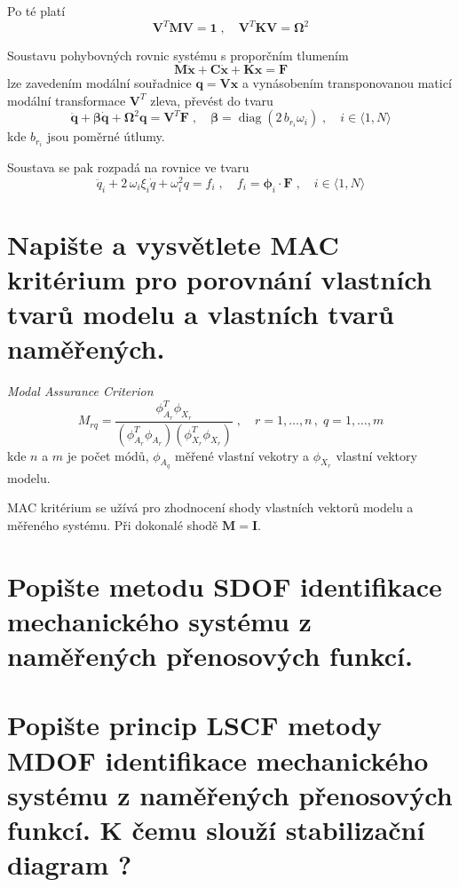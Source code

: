 \documentclass{article}
\begin{document}
	Po té platí
	\begin{equation*}
		\bm{V}^T\bm{M}\bm{V} = \bm{1}
		\;,\quad 
		\bm{V}^T\bm{K}\bm{V} = \bm{\Omega}^2
	\end{equation*}

	Soustavu pohybovných rovnic systému s proporčním tlumením
	\begin{equation*}
		\bm{M}\bm{\ddot{x}} + \bm{C}\bm{\dot{x}} + \bm{K}\bm{x} = \bm{F}
	\end{equation*}
	lze zavedením modální souřadnice $\bm{q} = \bm{V}\bm{x}$ a vynásobením transponovanou maticí modální transformace $\bm{V}^T$ zleva, převést do tvaru
	\begin{equation*}
		\bm{\ddot{q}} + \bm{\beta}\bm{\dot{q}} + \bm{\Omega}^2 \bm{q} = \bm{V}^T \bm{F}
		\;,\quad 
		\bm{\beta} = \operatorname{diag}(2\,b_{r_i}\omega_i) \;,\quad i \in \langle 1,N \rangle
	\end{equation*}
	kde $ b_{r_i}$ jsou poměrné útlumy.

	Soustava se pak rozpadá na rovnice ve tvaru
	\begin{equation*}
		\ddot{q}_i + 2\,\omega_i\xi_i \dot{q} + \omega_i^2 q = f_i
		\;,\quad 
		f_i = \bm{\phi}_i \cdot \bm{F}
		\;,\quad 
		i \in \langle 1,N \rangle
	\end{equation*}

	\section{Napište a vysvětlete MAC kritérium pro porovnání vlastních tvarů modelu a vlastních tvarů naměřených. }
	\emph{Modal Assurance Criterion}
	\begin{equation}
	M_{rq} = \frac{\phi_{A_r}^T \phi_{X_r}}{(\phi_{A_r}^T\phi_{A_r})(\phi_{X_r}^T\phi_{X_r})}
	\;,\quad 
	r = 1,\dots,n \,,\; q = 1,\dots,m
	\end{equation}
	kde $n$ a $m$ je počet módů, $\phi_{A_q}$ měřené vlastní vekotry a $\phi_{X_r}$ vlastní vektory modelu.

	MAC kritérium se užívá pro zhodnocení shody vlastních vektorů modelu a měřeného systému. Při dokonalé shodě $\bm{M} = \bm{I}$.

	\section{Popište metodu SDOF identifikace mechanického systému z naměřených přenosových funkcí. }
	\section{Popište princip LSCF metody MDOF identifikace mechanického systému z naměřených přenosových funkcí. K čemu slouží stabilizační diagram ? }
\end{document}

